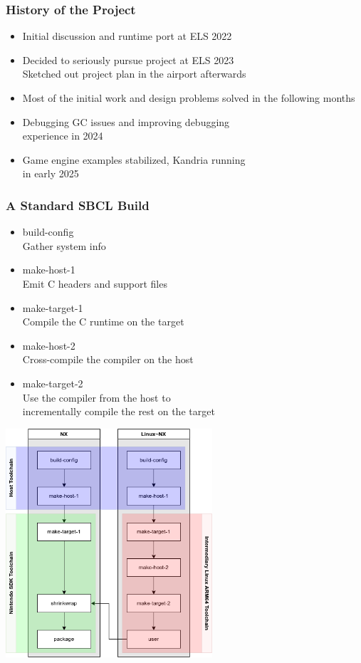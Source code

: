 \documentclass[14pt,t,aspectratio=169]{beamer}
\begin{document}
\begin{frame}
  \frametitle{History of the Project}
  \begin{itemize}
  \item Initial discussion and runtime port at ELS 2022 \\
  \item Decided to seriously pursue project at ELS 2023 \\
    \Rightarrow{} Sketched out project plan in the airport afterwards
  \item Most of the initial work and design problems solved in the
    following months \\
  \item Debugging GC issues and improving debugging \\
    experience in 2024 \\
  \item Game engine examples stabilized, Kandria running \\
    in early 2025 \\
  \end{itemize}
\end{frame}

\begin{frame}
  \frametitle{A Standard SBCL Build}
  \begin{itemize}
  \item build-config \\
    \Rightarrow{} Gather system info
  \item make-host-1 \\
    \Rightarrow{} Emit C headers and support files
  \item make-target-1 \\
    \Rightarrow{} Compile the C runtime on the target
  \item make-host-2 \\
    \Rightarrow{} Cross-compile the compiler on the host
  \item make-target-2 \\
    \Rightarrow{} Use the compiler from the host to\\
    \quad incrementally compile the rest on the target
  \end{itemize}
\end{frame}

\begin{frame}
  \includegraphics[height=8.5cm]{build.png}
\end{frame}
\end{document}
